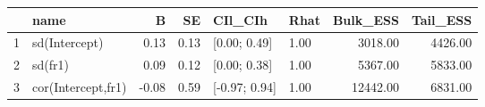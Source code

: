 \begin{table}[ht]
\centering
\begin{tabular}{rlrrllrr}
  \toprule
 & name & B & SE & CIl\_CIh & Rhat & Bulk\_ESS & Tail\_ESS \\ 
  \midrule
1 & sd(Intercept) & 0.13 & 0.13 & [0.00; 0.49] & 1.00 & 3018.00 & 4426.00 \\ 
  2 & sd(fr1) & 0.09 & 0.12 & [0.00; 0.38] & 1.00 & 5367.00 & 5833.00 \\ 
  3 & cor(Intercept,fr1) & -0.08 & 0.59 & [-0.97; 0.94] & 1.00 & 12442.00 & 6831.00 \\ 
   \bottomrule
\end{tabular}
\end{table}
